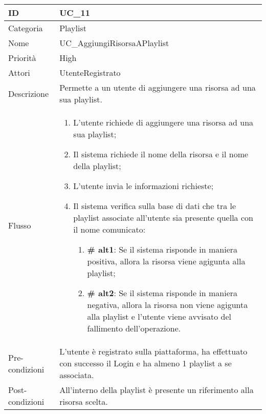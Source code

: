 \begin{center}
\begin{tabular}{ |p{2cm}|p{13cm}|  }
\hline
ID & UC\_11 \\\hline
Categoria & Playlist\\\hline
Nome & UC\_AggiungiRisorsaAPlaylist\\\hline
Priorità & High \\\hline
Attori &  UtenteRegistrato \\\hline
Descrizione & Permette a un utente di aggiungere una risorsa ad una sua playlist.\\\hline
Flusso &  	\begin{enumerate}
			\item L'utente richiede di aggiungere una risorsa ad una sua playlist;
			\item Il sistema richiede il nome della risorsa e il nome della playlist;
			\item L'utente invia le informazioni richieste;
			\item Il sistema verifica sulla base di dati che tra le playlist associate all'utente sia presente quella con il nome comunicato:
			\begin{enumerate}[  ]
				\item \textbf{\# alt1}: Se il sistema risponde in maniera positiva, allora la risorsa viene agigunta alla playlist;
				\item \textbf{\# alt2}: Se il sistema risponde in maniera negativa, allora la risorsa non viene  agigunta alla playlist e l'utente viene avvisato del fallimento dell'operazione.
			\end{enumerate}
		\end{enumerate}\\\hline
Pre-condizioni & L'utente è registrato sulla piattaforma, ha effettuato con successo il Login e ha almeno 1 playlist a se associata.\\\hline
Post-condizioni & All'interno della playlist è presente un riferimento alla risorsa scelta.\\\hline
\end{tabular}
\label{table_use_case:11}\newline


\end{center}
